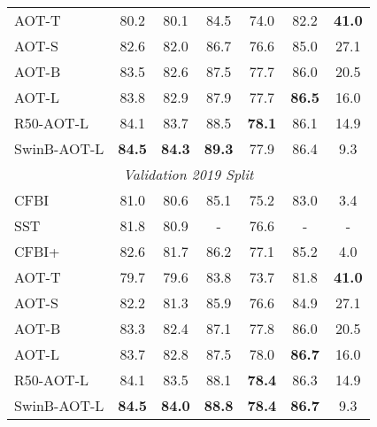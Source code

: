 \documentclass{article}
\newcommand{\pub}[1]{{\color{gray}{\tiny{[{#1}]}}}}
\begin{document}
\begin{table}[t!]
\begin{subtable}{.54\textwidth}
\begin{tabular}{lcccccc}
AOT-T & 80.2  &  80.1  & 84.5  & 74.0  & 82.2 & \textbf{41.0} \\
AOT-S & 82.6  &  82.0  & 86.7  & 76.6  & 85.0 & {27.1} \\
AOT-B & 83.5  &  {82.6}  & 87.5  & {77.7}  & 86.0 & 20.5 \\
AOT-L & {83.8}  &  {82.9}  & {87.9}  & {77.7}  & \textbf{86.5} & 16.0 \\
R50-AOT-L & {84.1}  &  {83.7}  & {88.5}  & \textbf{78.1}  & {86.1} & 14.9 \\
SwinB-AOT-L & \textbf{84.5}  &  \textbf{84.3}  & \textbf{89.3}  & {77.9}  & {86.4} & 9.3 \\
\midrule[1pt]
\multicolumn{7}{c}{\textit{Validation 2019 Split}} \\
\midrule[1pt]
CFBI\pub{ECCV20}~\cite{cfbi}  &  81.0  &  {80.6}  & {85.1}  & {75.2}  & {83.0} & 3.4  \\
SST\pub{CVPR21}~\cite{sstvos} & 81.8  &  80.9  &  -  &  76.6  &  - & - \\
CFBI+\pub{TPAMI21}~\cite{cfbip} &  82.6  &  81.7  & 86.2  & 77.1  & 85.2 & 4.0 \\
\hline
AOT-T &  79.7  &  79.6  & 83.8  & 73.7  & 81.8 & \textbf{41.0} \\
AOT-S &  82.2 &  81.3  & 85.9  & 76.6  & 84.9 & {27.1} \\
AOT-B &  83.3 &  {82.4}  & {87.1}  & 77.8  & 86.0 & 20.5 \\
AOT-L &  {83.7} &  {82.8}  & {87.5}  & {78.0}  & \textbf{86.7} & 16.0 \\
R50-AOT-L & {84.1}  &  {83.5}  & {88.1}  & \textbf{78.4}  & {86.3} & 14.9 \\
SwinB-AOT-L & \textbf{84.5}  &  \textbf{84.0}  & \textbf{88.8}  & \textbf{78.4}  & \textbf{86.7} & 9.3 \\

\bottomrule[1.5pt]
\end{tabular}

\end{subtable}
\begin{subtable}{.45\textwidth}











\end{subtable}
\end{table}
\end{document}
